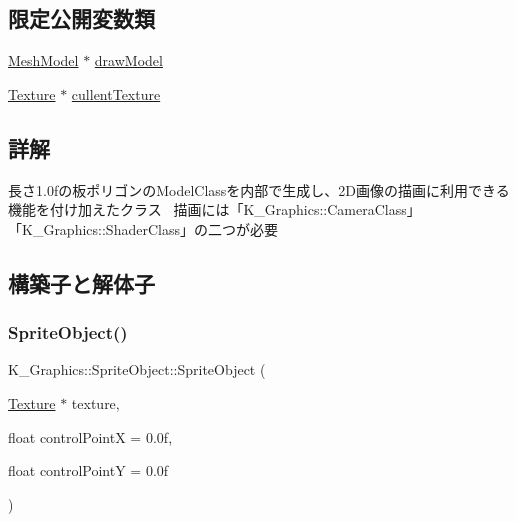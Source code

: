 \subsection*{限定公開変数類}
\begin{DoxyCompactItemize}
\item 
\mbox{\hyperlink{class_k___graphics_1_1_mesh_model}{Mesh\+Model}} $\ast$ \mbox{\hyperlink{class_k___graphics_1_1_sprite_object_a91966c81a550dd6b04ccc0bd210c289d}{draw\+Model}}
\item 
\mbox{\hyperlink{class_k___graphics_1_1_texture}{Texture}} $\ast$ \mbox{\hyperlink{class_k___graphics_1_1_sprite_object_a7cf528d065c242528bf0bd407a139f09}{cullent\+Texture}}
\end{DoxyCompactItemize}


\subsection{詳解}
長さ1.0fの板ポリゴンの\+Model\+Classを内部で生成し、2\+D画像の描画に利用できる機能を付け加えたクラス~\newline
描画には「\+K\+\_\+\+Graphics\+::\+Camera\+Class」「\+K\+\_\+\+Graphics\+::\+Shader\+Class」の二つが必要 

\subsection{構築子と解体子}
\mbox{\label{class_k___graphics_1_1_sprite_object_a9fe538248d36f9b2c20688f0053af112}} 
\subsubsection{\texorpdfstring{Sprite\+Object()}{SpriteObject()}}
{\footnotesize\ttfamily K\+\_\+\+Graphics\+::\+Sprite\+Object\+::\+Sprite\+Object (\begin{DoxyParamCaption}\item[{\mbox{\hyperlink{class_k___graphics_1_1_texture}{Texture}} $\ast$}]{texture,  }\item[{float}]{control\+PointX = {\ttfamily 0.0f},  }\item[{float}]{control\+PointY = {\ttfamily 0.0f} }\end{DoxyParamCaption})}



